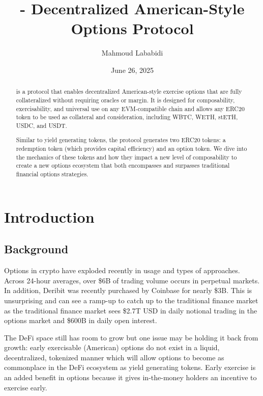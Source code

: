 \title{\greekfi - Decentralized American-Style Options Protocol}

\author{Mahmoud Lababidi}
\affiliation{%
\greekfi 
}

\date{June 26, 2025}

\begin{abstract}
\greekfi is a protocol that enables decentralized American-style exercise options that are fully collateralized without requiring oracles or margin. 
It is designed for composability, exercisability, and universal use on any EVM-compatible chain and allows any ERC20 token to be used as collateral and consideration, including WBTC, WETH, stETH, USDC, and USDT. 

Similar to yield generating tokens, the protocol generates two ERC20 tokens: a redemption token (which provides capital efficiency) and an option token.
We dive into the mechanics of these tokens and how they impact a new level of composability to create a new options ecosystem that both encompasses and surpasses traditional financial options strategies.


\end{abstract}

\maketitle

\section{\label{sec:introduction}Introduction}

\subsection{Background}
Options in crypto have exploded recently in usage and types of approaches. 
Across 24-hour averages, over \$6B of trading volume occurs in perpetual markets. 
In addition, Deribit was recently purchased by Coinbase for nearly \$3B. 
This is unsurprising and can see a ramp-up to catch up to the traditional finance market as the traditional finance market sees \$2.7T USD in daily notional trading in the options market and \$600B in daily open interest. 

The DeFi space still has room to grow but one issue may be holding it back from growth: early exercisable (American) options do not exist in a liquid, decentralized, tokenized manner which will allow options to become as commonplace in the DeFi ecosystem as yield generating tokens. 
Early exercise is an added benefit in options because it gives in-the-money holders an incentive to exercise early.

